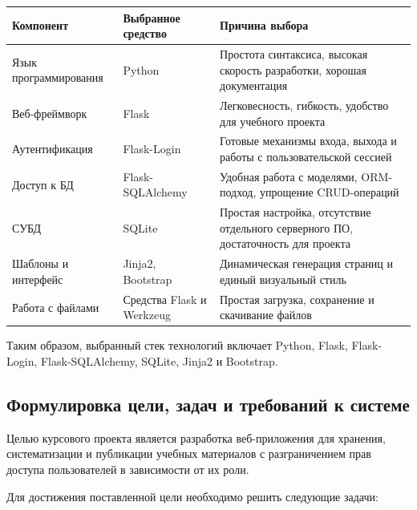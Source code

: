 \begin{center}
\footnotesize\begin{tabularx}{0.96\textwidth}{>{\raggedright\arraybackslash}p{4.1cm} >{\raggedright\arraybackslash}p{3.1cm} >{\raggedright\arraybackslash}X}
\toprule
\textbf{Компонент} & \textbf{Выбранное средство} & \textbf{Причина выбора} \\
\midrule
Язык программирования & Python & Простота синтаксиса, высокая скорость разработки, хорошая документация \\
Веб-фреймворк & Flask & Легковесность, гибкость, удобство для учебного проекта \\
Аутентификация & Flask-Login & Готовые механизмы входа, выхода и работы с пользовательской сессией \\
Доступ к БД & Flask-SQLAlchemy & Удобная работа с моделями, ORM-подход, упрощение CRUD-операций \\
СУБД & SQLite & Простая настройка, отсутствие отдельного серверного ПО, достаточность для проекта \\
Шаблоны и интерфейс & Jinja2, Bootstrap & Динамическая генерация страниц и единый визуальный стиль \\
Работа с файлами & Средства Flask и Werkzeug & Простая загрузка, сохранение и скачивание файлов \\
\bottomrule
\end{tabularx}
\end{center}

Таким образом, выбранный стек технологий включает Python, Flask, Flask-Login, Flask-SQLAlchemy, SQLite, Jinja2 и Bootstrap.

\subsection{Формулировка цели, задач и требований к системе}

Целью курсового проекта является разработка веб-приложения для хранения, систематизации и публикации учебных материалов с разграничением прав доступа пользователей в зависимости от их роли.

Для достижения поставленной цели необходимо решить следующие задачи:

